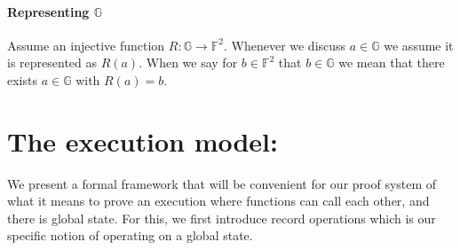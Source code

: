 \documentclass[11pt]{article} %
\newcommand{\G}{\ensuremath{{\mathbb G}}\xspace}
\newcommand{\F}{\ensuremath{\mathbb F}\xspace}
\newcommand{\srs}{\ensuremath{\mathsf{srs}}\xspace}
\newcommand{\negl}{\ensuremath{\mathsf{negl}(\lambda)}\xspace}
\newcommand{\sett}[2]{\ensuremath{\set{#1}_{#2}}\xspace}
\newcommand{\set}[1]{\ensuremath{\left\{#1\right\}}\xspace}
\newcommand{\poly}{\ensuremath{\mathsf{poly(\lambda)}}\xspace}
\begin{document}
% 
% 
% 
% 

\paragraph{Representing \G}
Assume an injective function $R:\G \to \F^2$.
Whenever we discuss $a\in \G$ we assume it is represented as  $R(a)$.
When we say for $b\in \F^2$ that $b\in \G$ we mean that there exists $a\in \G$ with $R(a)=b$.

\section{The execution model:}
We present a formal framework that will be convenient for our proof system of what it means to prove an execution where functions can call each other, and there is global state.
For this, we first introduce record operations which is our specific notion of operating on a global state. 
\end{document}
